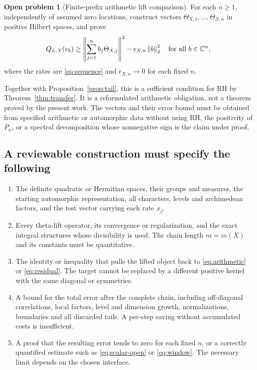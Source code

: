 \documentclass[11pt,letterpaper]{article}
\theoremstyle{definition}
\newtheorem{problem}[theorem]{Open problem}
\theoremstyle{remark}
\newcommand{\C}{\mathbb C}
\newcommand{\norm}[1]{\left\lVert#1\right\rVert}
\numberwithin{equation}{section}
\begin{document}
\begin{problem}[Finite-prefix arithmetic lift comparison]\label{prob:lift}
For each $n\ge1$, independently of assumed zero locations, construct vectors
$\Theta_{X,1},\ldots,\Theta_{X,n}$ in positive Hilbert spaces, and prove
\begin{equation}\label{eq:missing}
 Q_{L,X}(v_b)\ge
 \norm{\sum_{j=1}^n b_j\Theta_{X,j}}^2
 -\epsilon_{X,n}\norm b_2^2
 \quad\hbox{for all }b\in\C^n,
\end{equation}
where the rates are \eqref{eq:sequence} and $\epsilon_{X,n}\to0$ for each fixed $n$.
\end{problem}
Together with Proposition~\ref{prop:tail}, this is a sufficient condition for RH by Theorem~\ref{thm:transfer}. It is a reformulated arithmetic obligation, not a theorem proved by the present work.
The vectors and their error bound must be obtained from specified arithmetic or automorphic data without using RH, the positivity of $P_n$, or a spectral decomposition whose nonnegative sign is the claim under proof.

\subsection{A reviewable construction must specify the following}
\begin{enumerate}
\item The definite quadratic or Hermitian spaces, their groups and measures, the starting automorphic representation, all characters, levels and archimedean factors, and the test vector carrying each rate $x_j$.
\item Every theta-lift operator, its convergence or regularization, and the exact integral structures whose divisibility is used. The chain length $m=m(X)$ and its constants must be quantitative.
\item The identity or inequality that pulls the lifted object back to \eqref{eq:arithmetic} or \eqref{eq:residual}. The target cannot be replaced by a different positive kernel with the same diagonal or symmetries.
\item A bound for the total error after the complete chain, including off-diagonal correlations, local factors, level and dimension growth, normalizations, boundaries and all discarded tails. A per-step saving without accumulated costs is insufficient.
\item A proof that the resulting error tends to zero for each fixed $n$, or a correctly quantified estimate such as \eqref{eq:scalar-open} or \eqref{eq:window}. The necessary limit depends on the chosen interface.
\end{enumerate}
\end{document}
